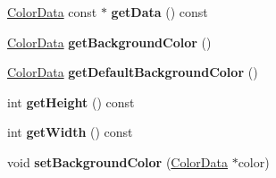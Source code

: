 \begin{DoxyCompactItemize}
\item 
\hypertarget{classPixelBuffer_afa8e098930154f21399cc7de6a2fff85}{\hyperlink{classColorData}{Color\-Data} const $\ast$ {\bfseries get\-Data} () const }\label{classPixelBuffer_afa8e098930154f21399cc7de6a2fff85}

\item 
\hypertarget{classPixelBuffer_a7eadc0d458fec5d0e0f502d279b86ea7}{\hyperlink{classColorData}{Color\-Data} {\bfseries get\-Background\-Color} ()}\label{classPixelBuffer_a7eadc0d458fec5d0e0f502d279b86ea7}

\item 
\hypertarget{classPixelBuffer_a36649accdea429915280ba71a7976300}{\hyperlink{classColorData}{Color\-Data} {\bfseries get\-Default\-Background\-Color} ()}\label{classPixelBuffer_a36649accdea429915280ba71a7976300}

\item 
\hypertarget{classPixelBuffer_abd5685a6a23041ed9640da9370eb7839}{int {\bfseries get\-Height} () const }\label{classPixelBuffer_abd5685a6a23041ed9640da9370eb7839}

\item 
\hypertarget{classPixelBuffer_a26dc9286596d27cd416d34611c00602e}{int {\bfseries get\-Width} () const }\label{classPixelBuffer_a26dc9286596d27cd416d34611c00602e}

\item 
\hypertarget{classPixelBuffer_a1838bd976c9c98a79b0c2eb1246b816f}{void {\bfseries set\-Background\-Color} (\hyperlink{classColorData}{Color\-Data} $\ast$color)}\label{classPixelBuffer_a1838bd976c9c98a79b0c2eb1246b816f}

\end{DoxyCompactItemize}
